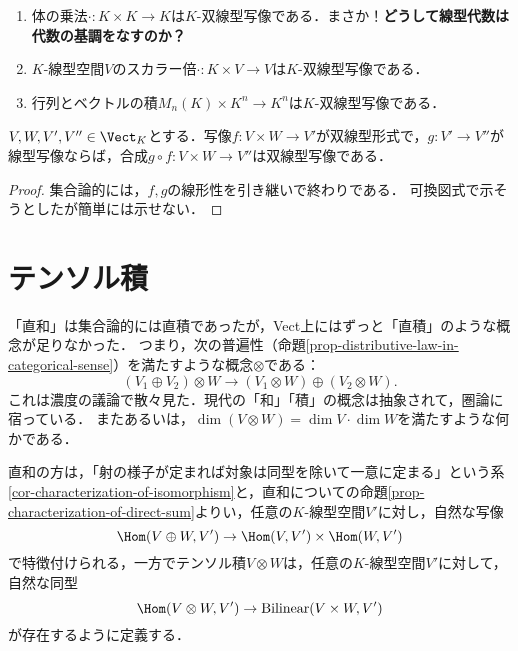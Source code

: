 \documentclass[uplatex, dvipdfmx]{jsreport}
\begin{document}
\begin{example}\mbox{}
    \begin{enumerate}
        \item 体の乗法$\cdot:K\times K\to K$は$K$-双線型写像である．まさか！\textbf{どうして線型代数は代数の基調をなすのか？}
        \item $K$-線型空間$V$のスカラー倍$\cdot:K\times V\to V$は$K$-双線型写像である．
        \item 行列とベクトルの積$M_n(K)\times K^n\to K^n$は$K$-双線型写像である．
    \end{enumerate}
\end{example}

\begin{proposition}
    $V,W,V',V''\in\Vect_K$とする．写像$f:V\times W\to V'$が双線型形式で，$g:V'\to V''$が線型写像ならば，合成$g\circ f:V\times W\to V''$は双線型写像である．
\end{proposition}
\begin{proof}
    集合論的には，$f,g$の線形性を引き継いで終わりである．
    可換図式で示そうとしたが簡単には示せない．
\end{proof}

\section{テンソル積}

\begin{tcolorbox}[colframe=ForestGreen, colback=ForestGreen!10!white, breakable, title=直積に当たるもの]
    「直和」は集合論的には直積であったが，Vect上にはずっと「直積」のような概念が足りなかった．
    つまり，次の普遍性（命題\ref{prop-distributive-law-in-categorical-sense}）を満たすような概念$\otimes$である：
    \[(V_1\oplus V_2)\otimes W\to(V_1\otimes W)\oplus(V_2\otimes W).\]
    これは濃度の議論で散々見た．現代の「和」「積」の概念は抽象されて，圏論に宿っている．
    またあるいは，$\dim(V\otimes W)=\dim V\cdot\dim W$を満たすような何かである．

    直和の方は，「射の様子が定まれば対象は同型を除いて一意に定まる」という系\ref{cor-characterization-of-isomorphism}と，直和についての命題\ref{prop-characterization-of-direct-sum}よりい，任意の$K$-線型空間$V'$に対し，自然な写像
    \[\Hom(V\oplus W,V')\to\Hom(V,V')\times\Hom(W,V')\]
    で特徴付けられる，一方でテンソル積$V\otimes W$は，任意の$K$-線型空間$V'$に対して，自然な同型
    \[\Hom(V\otimes W,V')\to\mathrm{Bilinear}(V\times W,V')\]
    が存在するように定義する．
\end{tcolorbox}
\end{document}
